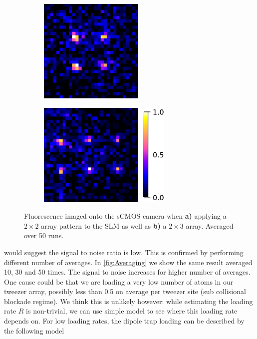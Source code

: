 \begin{figure}
    \centering
	\begin{subfigure}{.49\linewidth}
		\centering
		\includegraphics[height=5cm]{figures/2x2fluorescence.pdf}
		\caption{}
		\label{fig:fluor2x2}
	\end{subfigure}
	\hfill
	\begin{subfigure}{.49\linewidth}
		\centering
		\includegraphics[height=5cm]{figures/2x3fluorescence.pdf}
		\caption{}
		\label{fig:fluor2x3}
	\end{subfigure}
	\caption{
	Fluorescence imaged onto the sCMOS camera when \textsf{\textbf{a)}} applying a $2\times2$ array pattern to the SLM as well as \textsf{\textbf{b)}} a $2\times 3$ array.
	Averaged over 50 runs.
    }
    \label{fig:fluorescence}
\end{figure}
 would suggest the signal to noise ratio is low. 
This is confirmed by performing different number of averages.
In \cref{fig:Averaging} we show the same result averaged 10, 30 and 50 times. 
The signal to noise increases for higher number of averages.
One cause could be that we are loading a very low number of atoms in our tweezer array, possibly less than 0.5 on average per tweezer site (sub collisional blockade regime).
We think this is unlikely however: while estimating the loading rate $R$ is non-trivial, we can use simple model to see where this loading rate depends on. 
For low loading rates, the dipole trap loading can be described by the following model \cite{Kuppens2000}

